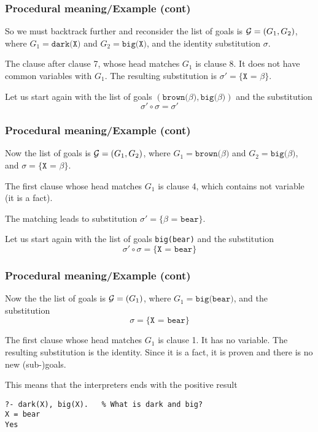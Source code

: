 %
\begin{frame}
\frametitle{Procedural meaning/Example (cont)}

So we must backtrack further and reconsider the list of
goals is \({\cal G} = (G_1, G_2)\), where \(G_1 = \texttt{dark(X)}\)
and \(G_2 = \texttt{big(X)}\), and the identity substitution \(\sigma\).

\bigskip

The clause after clause 7, whose head matches \(G_1\) is clause 8. It
does not have common variables with \(G_1\). The resulting
substitution is \(\sigma' = \{\texttt{X = } \beta\}\).

\bigskip

Let us start again with the list of goals
\((\texttt{brown(}\beta\texttt{)}, \texttt{big(}\beta\texttt{)})\)
and the substitution \[\sigma' \circ \sigma = \sigma'\]

\end{frame}

%
\begin{frame}
\frametitle{Procedural meaning/Example (cont)}

Now the list of goals is \({\cal G} = (G_1, G_2)\), where \(G_1 =
\texttt{brown(}\beta\texttt{)}\) and \(G_2 =
\texttt{big(}\beta\texttt{)}\), and \(\sigma = \{\texttt{X = }
\beta\}\).

\bigskip

The first clause whose head matches \(G_1\) is clause 4, which
contains not variable (it is a fact). 

\bigskip

The matching leads to substitution \(\sigma' = \{\beta \texttt{ =
  bear}\}\).

\bigskip

Let us start again with the list of goals
\texttt{big(bear)} and the substitution 
\[
\sigma' \circ \sigma = \{\texttt{X = bear}\}
\]

\end{frame}

%
\begin{frame}[containsverbatim]
\frametitle{Procedural meaning/Example (cont)}

Now the the list of goals is \({\cal G} = (G_1)\), where \(G_1 =
\texttt{big(bear)}\), and the substitution \[\sigma = \{\texttt{X =
  bear}\}\]

\bigskip

The first clause whose head matches \(G_1\) is clause 1. It has no
variable. The resulting substitution is the identity. Since it is a
fact, it is proven and there is no new (sub-)goals.

\bigskip

This means that the interpreters ends with the positive result
{\small
\begin{verbatim}
?- dark(X), big(X).   % What is dark and big?
X = bear
Yes
\end{verbatim}
}

\end{frame}

